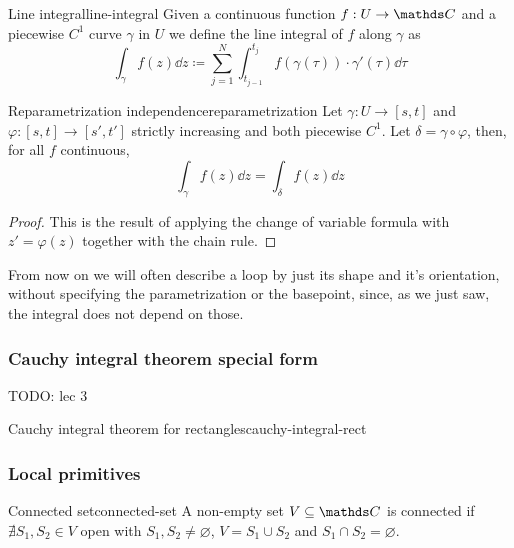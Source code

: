 \documentclass[12pt]{extarticle}
\begin{document}
\begin{definition}{Line integral}{line-integral}
	Given a continuous function $f: U \to \C$ and a piecewise $C^1$ curve $\gamma$ in $U$ we define the line
	integral of $f$ along $\gamma$ as
	\begin{equation}
		\int_\gamma f(z) \dd z \coloneq
		\sum_{j = 1}^N \int_{t_{j-1}}^{t_j} f(\gamma(\tau)) \cdot \gamma'(\tau) \dd{\tau}
	\end{equation}
\end{definition}

\begin{proposition}{Reparametrization independence}{reparametrization}
	Let $\gamma: U \to [s, t]$ and $\varphi: [s, t] \to [s', t']$ strictly increasing and both
	piecewise $C^1$.
	Let $\delta = \gamma \circ \varphi$, then, for all $f$ continuous,
	\begin{equation}
		\int_\gamma f(z) \dd z = \int_\delta f(z) \dd z
	\end{equation}
\end{proposition}
\begin{proof}
	This is the result of applying the change of variable formula with $z'= \varphi(z)$
	together with the chain rule.
\end{proof}

From now on we will often describe a loop by just its shape and it's orientation, without specifying
the parametrization or the basepoint, since, as we just saw, the integral does not depend on those.

\subsubsection{Cauchy integral theorem special form}

TODO: lec 3

\begin{theorem}{Cauchy integral theorem for rectangles}{cauchy-integral-rect}
\end{theorem}

\subsubsection{Local primitives}

\begin{definition}{Connected set}{connected-set}
	A non-empty set $V \subseteq \C$ is connected if
	$\nexists S_1, S_2 \in V$ open with $S_1, S_2 \neq \varnothing$,
	$V = S_1 \cup S_2$ and $S_1 \cap S_2 = \varnothing$.
\end{definition}
\end{document}
